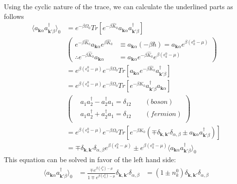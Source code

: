 Using the cyclic nature of the trace, we can calculate the underlined parts as follows
$$
\begin{aligned}
\langle a_{\mathbf{k}\alpha} a_{\mathbf{k'}\beta}^{\dagger}\rangle_{0}&=e^{-\beta\Omega_{0}} Tr \left[ e^{-\beta\hat{K}_{0}} a_{\mathbf{k}\alpha } a_{\mathbf{k'}\beta}^{\dagger} \right]\\
&\left(
\begin{aligned}
e^{-\beta\hat{K}_{0}}a_{\mathbf{k}\alpha}e^{\beta\hat{K}_{0}}& \equiv a_{\mathbf{k}\alpha}(-\beta\hbar) =a_{\mathbf{k}\alpha}e^{\beta(\epsilon_{k}^{0}-\mu)}\\
\therefore e^{-\beta\hat{K}_{0}}a_{\mathbf{k}\alpha}&= a_{\mathbf{k}\alpha} e^{-\beta\hat{K}_{0}} e^{\beta(\epsilon_{k}^{0}-\mu)}
\end{aligned}
\right)\\
&=e^{\beta(\epsilon_{k}^{0}-\mu)}e^{-\beta\Omega_{0}} Tr \left[a_{\mathbf{k}\alpha } e^{-\beta\hat{K}_{0}} a_{\mathbf{k'}\beta}^{\dagger} \right]\\
&=e^{\beta(\epsilon_{k}^{0}-\mu)}e^{-\beta\Omega_{0}} Tr \left[e^{-\beta\hat{K}_{0}} a_{\mathbf{k'}\beta}^{\dagger} a_{\mathbf{k}\alpha}\right]\\
&\left(
\begin{aligned}
&a_{1}a_{2}^{\dagger}-a_{2}^{\dagger}a_{1}=\delta_{12}\qquad(boson)\\
&a_{1}a_{2}^{\dagger}+a_{2}^{\dagger}a_{1}=\delta_{12}\qquad(fermion)\\
\end{aligned}
\right)\\
&=e^{\beta(\epsilon_{k}^{0}-\mu)}e^{-\beta\Omega_{0}} Tr \left[e^{-\beta\hat{K}_{0}} \left( \mp\delta_{\mathbf{k},\mathbf{k'}}\delta_{\alpha,\beta}\pm a_{\mathbf{k}\alpha } a_{\mathbf{k'}\beta}^{\dagger} \right)\right]\\
&=\mp\delta_{\mathbf{k},\mathbf{k'}}\delta_{\alpha,\beta} e^{\beta(\epsilon_{k}^{0}-\mu)} \pm e^{\beta(\epsilon_{k}^{0}-\mu)}
\langle a_{\mathbf{k}\alpha} a_{\mathbf{k'}\beta}^{\dagger}\rangle_{0}
\end{aligned}
$$
This equation can be solved in favor of the left hand side:
\begin{equation}
\begin{aligned}
\langle a_{\mathbf{k}\alpha} a_{\mathbf{k'}\beta}^{\dagger}\rangle_{0}&=\frac{\mp e^{\beta(\epsilon_{k}^{0})-\mu}}{1\mp e^{\beta(\epsilon_{k}^{0})-\mu}} \delta_{\mathbf{k},\mathbf{k'}}\delta_{\alpha,\beta}
&=(1\pm n_{k}^{0})\delta_{\mathbf{k},\mathbf{k'}}\delta_{\alpha,\beta}
\end{aligned}
\end{equation}
